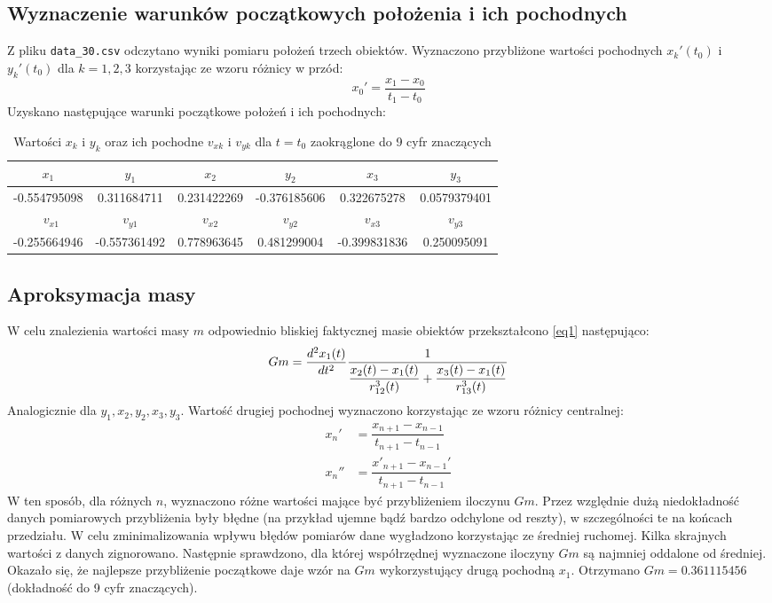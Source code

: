 \documentclass[a4paper, 12pt, twoside, openany]{article}
\begin{document}
	\subsection{Wyznaczenie warunków początkowych położenia i ich pochodnych}
	Z pliku \texttt{data\_30.csv} odczytano wyniki pomiaru położeń trzech obiektów. Wyznaczono przybliżone wartości pochodnych $x_k'(t_0)$ i $y_k'(t_0)$ dla $k = 1,2,3$ korzystając ze wzoru różnicy w przód:
	$$ x_0' = \dfrac{x_1 - x_0}{t_1 - t_0} $$
	Uzyskano następujące warunki początkowe położeń i ich pochodnych: 
	\begin{table}[H]
		\centering
		\begin{tabular}{|c|c|c|c|c|c|}
			\hline
			$x_1$ & $y_1$ & $x_2$ & $y_2$ & $x_3$ & $y_3$ \\
			\hline
			-0.554795098 & 0.311684711 & 0.231422269 & -0.376185606 & 0.322675278 & 0.0579379401 \\
			\hline\
			$v_{x1}$ & $v_{y1}$ & $v_{x2}$ & $v_{y2}$ & $v_{x3}$ & $v_{y3}$ \\
			\hline
			-0.255664946 & -0.557361492 & 0.778963645 & 0.481299004 & -0.399831836 & 0.250095091 \\
			\hline
		\end{tabular}
		\caption{Wartości $x_k$ i $y_k$ oraz ich pochodne $v_{xk}$ i $v_{yk}$ dla $t = t_0$ zaokrąglone do 9 cyfr znaczących}
	\end{table}
	
	
	\subsection{Aproksymacja masy}  
	W celu znalezienia wartości masy $m$ odpowiednio bliskiej faktycznej masie obiektów przekształcono \eqref{eq1} następująco:
	$$			
	Gm = \dfrac{d^2x_1(t)}{dt^2} \dfrac{1}{ \dfrac{x_2(t) - x_1(t)}{r^3_{12}(t)} + \dfrac{x_3(t) - x_1(t)}{r^3_{13}(t)}} \\
	$$
	Analogicznie dla $y_1,x_2,y_2,x_3,y_3$. Wartość drugiej pochodnej wyznaczono korzystając ze wzoru różnicy centralnej:
	$$
	\begin{aligned}
		x_n'  &= \dfrac{x_{n+1} - x_{n-1}}{t_{n+1} - t_{n-1}} \\
		x_n'' &= \dfrac{x'_{n+1} - x_{n-1}'}{t_{n+1} - t_{n-1}} 
	\end{aligned}
	$$
	W ten sposób, dla różnych $n$, wyznaczono różne wartości mające być przybliżeniem iloczynu $Gm$.
	Przez względnie dużą niedokładność danych pomiarowych przybliżenia były błędne (na przykład ujemne bądź bardzo odchylone od reszty), w szczególności te na końcach przedziału. W celu zminimalizowania wpływu błędów pomiarów dane wygładzono korzystając ze średniej ruchomej. Kilka skrajnych wartości z danych zignorowano. Następnie sprawdzono, dla której współrzędnej wyznaczone iloczyny $Gm$ są najmniej oddalone od średniej.\\
	Okazało się, że najlepsze przybliżenie początkowe daje wzór na $Gm$ wykorzystujący drugą pochodną $x_1$. Otrzymano $Gm = 0.361115456$ (dokładność do 9 cyfr znaczących). 
	
\end{document}
